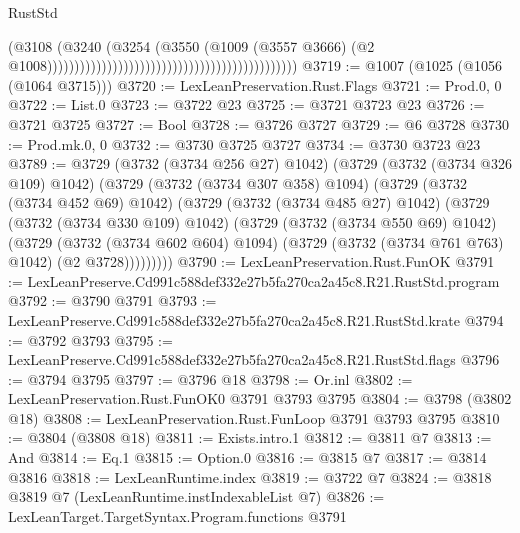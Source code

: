 \begin{lexlean}{RustStd}
\begin{coremodule}
                                                                                    (@3108
                                                                                      (@3240
                                                                                        (@3254
                                                                                          (@3550
                                                                                            (@1009
                                                                                              (@3557
                                                                                                @3666)
                                                                                              (@2
                                                                                                @1008))))))))))))))))))))))))))))))))))))))))))))))
@3719 := @1007 (@1025 (@1056 (@1064 @3715)))
@3720 := LexLeanPreservation.Rust.Flags
@3721 := Prod.{0, 0}
@3722 := List.{0}
@3723 := @3722 @23
@3725 := @3721 @3723 @23
@3726 := @3721 @3725
@3727 := Bool
@3728 := @3726 @3727
@3729 := @6 @3728
@3730 := Prod.mk.{0, 0}
@3732 := @3730 @3725 @3727
@3734 := @3730 @3723 @23
@3789 := @3729
    (@3732 (@3734 @256 @27) @1042)
    (@3729
      (@3732 (@3734 @326 @109) @1042)
      (@3729
        (@3732 (@3734 @307 @358) @1094)
        (@3729
          (@3732 (@3734 @452 @69) @1042)
          (@3729
            (@3732 (@3734 @485 @27) @1042)
            (@3729
              (@3732 (@3734 @330 @109) @1042)
              (@3729
                (@3732 (@3734 @550 @69) @1042)
                (@3729
                  (@3732 (@3734 @602 @604) @1094)
                  (@3729 (@3732 (@3734 @761 @763) @1042) (@2 @3728)))))))))
@3790 := LexLeanPreservation.Rust.FunOK
@3791 := LexLeanPreserve.Cd991c588def332e27b5fa270ca2a45c8.R21.RustStd.program
@3792 := @3790 @3791
@3793 := LexLeanPreserve.Cd991c588def332e27b5fa270ca2a45c8.R21.RustStd.krate
@3794 := @3792 @3793
@3795 := LexLeanPreserve.Cd991c588def332e27b5fa270ca2a45c8.R21.RustStd.flags
@3796 := @3794 @3795
@3797 := @3796 @18
@3798 := Or.inl
@3802 := LexLeanPreservation.Rust.FunOK0 @3791 @3793 @3795
@3804 := @3798 (@3802 @18)
@3808 := LexLeanPreservation.Rust.FunLoop @3791 @3793 @3795
@3810 := @3804 (@3808 @18)
@3811 := Exists.intro.{1}
@3812 := @3811 @7
@3813 := And
@3814 := Eq.{1}
@3815 := Option.{0}
@3816 := @3815 @7
@3817 := @3814 @3816
@3818 := LexLeanRuntime.index
@3819 := @3722 @7
@3824 := @3818 @3819 @7 (LexLeanRuntime.instIndexableList @7)
@3826 := LexLeanTarget.TargetSyntax.Program.functions @3791

\end{coremodule}
\end{lexlean}
